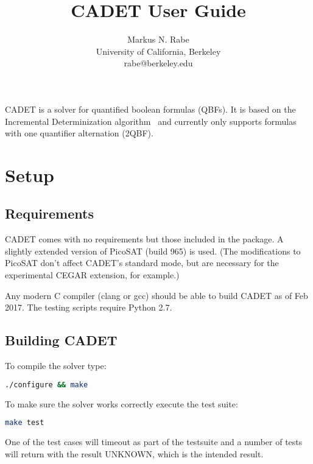 \documentclass{article}
\title{CADET User Guide}
\author{Markus N. Rabe \\ University of California, Berkeley \\ rabe@berkeley.edu}
\begin{document}
\maketitle

CADET is a solver for quantified boolean formulas (QBFs). 
It is based on the Incremental Determinization algorithm~\cite{RabeSeshia/2016/IncrementalDeterminization} and currently only supports formulas with one quantifier alternation (2QBF).

\tableofcontents


\section{Setup}

\subsection{Requirements}

CADET comes with no requirements but those included in the package. 
A slightly extended version of PicoSAT (build 965) is used. 
(The modifications to PicoSAT don't affect CADET's standard mode, but are necessary for the experimental CEGAR extension, for example.)

Any modern C compiler (clang or gcc) should be able to build CADET as of Feb 2017. 
The testing scripts require Python 2.7.


\subsection{Building CADET}
To compile the solver type:

\begin{lstlisting}[language = bash,
				   basicstyle=\footnotesize\ttfamily,
                   xleftmargin = 1cm,
                   framexleftmargin = 1em]
./configure && make
\end{lstlisting}

\noindent
To make sure the solver works correctly execute the test suite:

\begin{lstlisting}[language = bash,
				   basicstyle=\footnotesize\ttfamily,
                   xleftmargin = 1cm,
                   framexleftmargin = 1em]
make test
\end{lstlisting}
One of the test cases will timeout as part of the testsuite and a number of tests will return with the result UNKNOWN, which is the intended result. 
\end{document}
